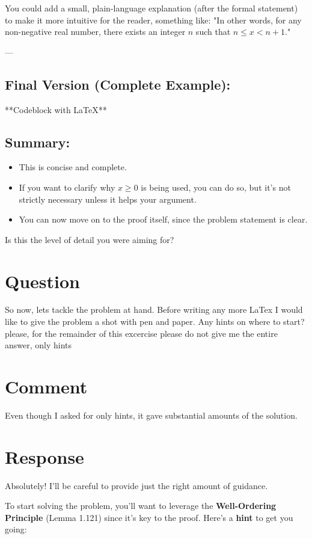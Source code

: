 \documentclass{article}
\begin{document}
You could add a small, plain-language explanation (after the formal statement) to make it more intuitive for the reader, something like: "In other words, for any non-negative real number, there exists an integer \( n \) such that \( n \leq x < n + 1 \)."

---

\subsection*{Final Version (Complete Example):}

**Codeblock with LaTeX**

\subsection*{Summary:}

\begin{itemize}
    \item This is concise and complete.
    \item If you want to clarify why \( x \geq 0 \) is being used, you can do so, but it’s not strictly necessary unless it helps your argument.
    \item You can now move on to the proof itself, since the problem statement is clear.
\end{itemize}

Is this the level of detail you were aiming for?

\section*{Question}
So now, lets tackle the problem at hand. Before writing any more LaTex I would like to give the problem a shot with pen and paper. Any hints on where to start? please, for the remainder of this excercise please do not give me the entire answer, only hints

\section*{Comment}
Even though I asked for only hints, it gave substantial amounts of the solution. 

\section*{Response}
Absolutely! I'll be careful to provide just the right amount of guidance.

To start solving the problem, you'll want to leverage the \textbf{Well-Ordering Principle} (Lemma 1.121) since it's key to the proof. Here's a \textbf{hint} to get you going:
\end{document}
